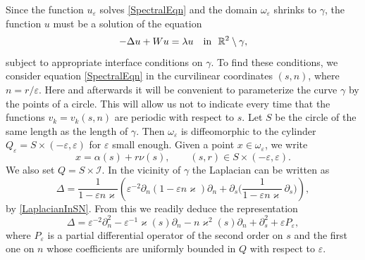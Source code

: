 \documentclass[reqno]{amsart}
\theoremstyle{plain}
\numberwithin{equation}{section}
\renewcommand{\kappa}{\varkappa}
\newcommand{\Real}{\mathbb R}
\newcommand{\eps}{\varepsilon}
\newcommand{\cI}{\mathcal{I}}
\begin{document}
Since the function $u_\eps$ solves \eqref{SpectralEqn} and the domain $\omega_\eps$ shrinks to $\gamma$, the function $u$ must be a solution of the equation
\begin{equation*}
-\Delta u+Wu= \lambda u \quad \hbox{in \ } \Real^2\setminus \gamma,
\end{equation*}
subject to appropriate interface conditions on $\gamma$.
To find these conditions, we consider equation \eqref{SpectralEqn} in the curvilinear coordinates $(s,n)$, where $n=r/\eps$. Here and afterwards it will be convenient to parameterize the curve $\gamma$ by the points of a circle. This  will allow us not to indicate every time that the functions $v_k=v_k(s,n)$ are periodic with respect to $s$.
Let $S$ be the circle of the same length as the length of $\gamma$.
Then $\omega_\eps$ is diffeomorphic to the cylinder $Q_\eps=S\times (-\eps, \eps)$ for $\eps$ small enough. Given a point $x\in \omega_\eps$, we write
\begin{equation*}
    x=\alpha(s)+r\nu(s), \qquad (s,r)\in S\times (-\eps, \eps).
\end{equation*}
We also set  $Q=S\times \cI$.
In the vicinity of $\gamma$ the Laplacian can be written as
\begin{equation*}
  \Delta =\frac1{1-\eps n\kappa}\left( \eps^{-2}\partial_n
  (1-\eps n\kappa)\partial_n +\partial_s
  \Big(\frac1{1-\eps n\kappa}\,\partial_s\Big)\right),
\end{equation*}
by \eqref{LaplacianInSN}.
From this we readily deduce the  representation
\begin{equation}\label{LaplaceExpansion}
\Delta= \eps^{-2}\partial^2_n-\eps^{-1}\kappa(s)\partial_n
-n\kappa^2(s)\partial_n+\partial^2_s+\eps P_\eps,
\end{equation}
where $P_\eps$ is a partial differential operator of the second order on $s$ and the first one on $n$ whose coefficients  are uniformly bounded in $Q$ with respect to $\eps$.
\end{document}
